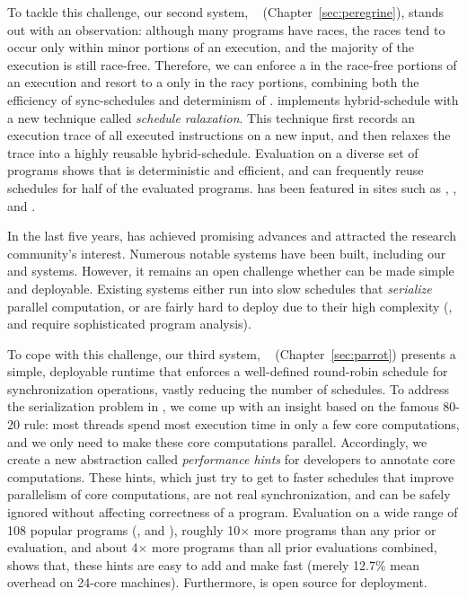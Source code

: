To tackle this challenge, our second \smt system,
\peregrine~\cite{peregrine:sosp11} (Chapter~\ref{sec:peregrine}), stands out
with an observation: although many programs have races, the races tend to occur
only within minor portions of an execution, and the majority of the execution is
still race-free. Therefore, we can enforce a \syncscheds in the race-free
portions of an execution and resort to a \memsched only in the racy portions,
combining both the efficiency of sync-schedules and determinism of \memscheds. 
\peregrine implements hybrid-schedule with a new technique called \emph{schedule
ralaxation}. This technique first records an execution trace of all executed
instructions on a new input, and then relaxes the trace into a highly reusable
hybrid-schedule. Evaluation on a diverse set of programs shows that \peregrine
is deterministic and efficient, and can frequently reuse schedules for half of
the evaluated programs. \peregrine has been featured in sites such as
\acmtechnews, \tgdaily, and \physorg.

 In the last five
years, \smt has achieved promising advances and attracted the research
community's interest. Numerous notable \smt systems have been built, including
our \tern and  \peregrine systems. However, it remains an open challenge whether
\smt can be made simple and deployable. Existing \smt systems either run into
slow schedules that \emph{serialize} parallel computation, or are fairly hard to
deploy due to their high complexity (\eg, \tern and \peregrine require
sophisticated program analysis).

To cope with this challenge, our third \smt system, \parrot~\cite{parrot:sosp13}
(Chapter~\ref{sec:parrot}) presents a simple, deployable runtime that enforces a
well-defined round-robin schedule for synchronization operations, vastly
reducing the number of schedules. To address the serialization problem in \smt,
we come up with an insight based on the famous 80-20 rule: most threads spend
most execution time in only a few core computations, and we only need to make 
these core computations parallel. Accordingly, we create a new abstraction
called \emph{performance hints} for developers to annotate core computations.
These hints, which just try to get to faster schedules that improve parallelism
of core computations, are not real synchronization, and can be safely ignored
without affecting correctness of a program. Evaluation on a wide range of 108
popular programs (\eg, \bdb and \mplayer), roughly 10$\times$ more programs than
any prior \smt or \dmt evaluation, and about 4$\times$ more programs than all
prior evaluations combined, shows that, these hints are easy to add and make
\parrot fast (merely 12.7\% mean overhead on 24-core machines). Furthermore,
\parrot is open source for deployment.


